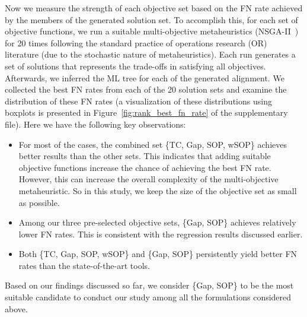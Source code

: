 Now we measure the strength of each objective set based on the FN rate achieved by the members of the generated solution set. To accomplish this, for each set of objective functions, we run a suitable multi-objective metaheuristics (NSGA-II~\citep{deb2002fast}) for 20 times following the standard practice of operations research (OR) literature (due to the stochastic nature of metaheuristics). Each run generates a set of solutions that represents the trade-offs in satisfying all objectives. Afterwards, we inferred the ML tree for each of the generated alignment. We collected the best FN rates from each of the 20 solution sets and examine the distribution of these FN rates (a visualization of these distributions using boxplots is presented in Figure~\ref{fig:rank_best_fn_rate} of the supplementary file). Here we have the following key observations:
\begin{itemize}
	\item For most of the cases, the combined set \{TC, Gap, SOP, wSOP\} achieves better results than the other sets. This indicates that adding suitable objective functions increase the chance of achieving the best FN rate. However, this can increase the overall complexity of the multi-objective metaheuristic. So in this study, we keep the size of the objective set as small as possible.
	\item Among our three pre-selected objective sets, \{Gap, SOP\} achieves relatively lower FN rates. This is consistent with the regression results discussed earlier.
	\item Both \{TC, Gap, SOP, wSOP\} and \{Gap, SOP\} persistently yield better FN rates than the state-of-the-art tools.
\end{itemize}
Based on our findings discussed so far, we consider \{Gap, SOP\} to be the most suitable candidate to conduct our study among all the formulations considered above. %

